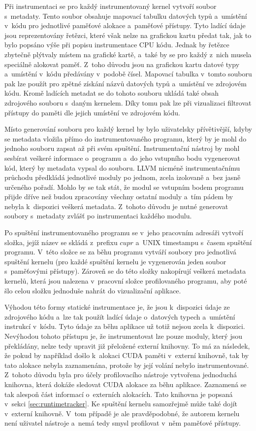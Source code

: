 Při instrumentaci se pro každý instrumentovaný kernel vytvoří soubor s~metadaty. Tento soubor obsahuje mapovací tabulku datových typů a~umístění v~kódu pro jednotlivé paměťové alokace a~paměťové přístupy. Tyto ladící údaje jsou reprezentovány řetězci, které však nelze na grafickou kartu předat tak, jak to bylo popsáno výše při popisu instrumentace CPU kódu. Jednak by řetězce zbytečně plýtvaly místem na grafické kartě, a~také by se pro každý z~nich musela speciálně alokovat paměť. Z~toho důvodu jsou na grafickou kartu datové typy a~umístění v~kódu předávány v~podobě čísel. Mapovací tabulka v~tomto souboru pak lze použít pro zpětné získání názvů datových typů a~umístění ve zdrojovém kódu. Kromě ladících metadat se do tohoto souboru ukládá také obsah zdrojového souboru s~daným kernelem. Díky tomu pak lze při vizualizaci filtrovat přístupy do paměti dle jejich umístění ve zdrojovém kódu.
    
Místo generování souboru pro každý kernel by bylo uživatelsky přívětivější, kdyby se metadata vložila přímo do instrumentovaného programu, který by je mohl do jednoho souboru zapsat až při svém spuštění. Instrumentační nástroj by mohl sesbírat veškeré informace o~programu a~do jeho vstupního bodu vygenerovat kód, který by metadata vypsal do souboru. LLVM nicméně instrumentačnímu průchodu předkládá jednotlivé moduly po jednom, zcela izolovaně a~bez jasně určeného pořadí. Mohlo by se tak stát, že modul se vstupním bodem programu přijde dříve než budou zpracovány všechny ostatní moduly a~tím pádem by nebyla k~dispozici veškerá metadata. Z~tohoto důvodu je nutné generovat soubory s~metadaty zvlášť po instrumentaci každého modulu.

Po spuštění instrumentovaného programu se v~jeho pracovním adresáři vytvoří složka, jejíž název se skládá z~prefixu $cupr$ a~UNIX timestampu s~časem spuštění programu. V~této složce se za běhu programu vytváří soubory pro jednotlivá spuštění kernelu (pro každé spuštění kernelu je vygenerován jeden soubor s~paměťovými přístupy). Zároveň se do této složky nakopírují veškerá metadata kernelů, která jsou nalezena v~pracovní složce profilovaného programu, aby poté šlo celou složku jednoduše nahrát do vizualizační aplikace.  

Výhodou této formy statické instrumentace je, že jsou k~dispozici údaje ze zdrojového kódu a~lze tak použít ladící údaje o~datových typech a~umístění instrukcí v~kódu. Tyto údaje za běhu aplikace už totiž nejsou zcela k~dispozici. Nevýhodou tohoto přístupu je, že instrumentovat lze pouze moduly, který jsou překládány, nelze tedy upravit již přeložené externí knihovny. To má za následek, že pokud by například došlo k~alokaci CUDA paměti v~externí knihovně, tak by tato alokace nebyla zaznamenána, protože by její volání nebylo instrumentované. Z~tohoto důvodu byla pro účely profilovacího nástroje vytvořena jednoduchá knihovna, která dokáže sledovat CUDA alokace za běhu aplikace. Zaznamená se tak alespoň část informací o~externích alokacích. Tato knihovna je popsaná v~sekci \ref{sec:runtimetracker}. Ke spuštění kernelu samozřejmě může také dojít v~externí knihovně. V~tom případě je ale pravděpodobné, že autorem kernelu není uživatel nástroje a~nemá tedy smysl profilovat v~něm paměťové přístupy.
    
